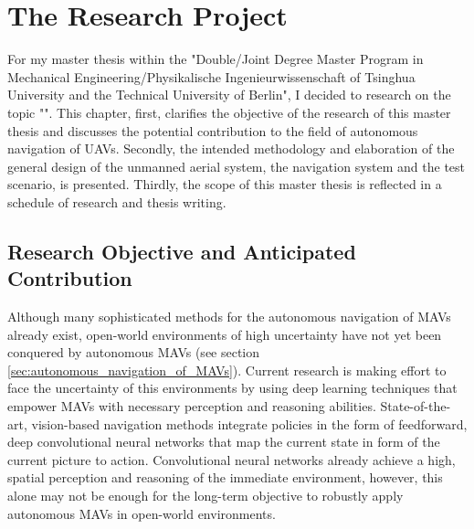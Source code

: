 
\chapter{The Research Project} \label{cha:research_project} %

For my master thesis within the  
"Double/Joint Degree Master Program in Mechanical Engineering/Physikalische Ingenieurwissenschaft 
of Tsinghua University and the Technical University of Berlin",
I decided to research on the topic "\ttitle".
This chapter, first, clarifies the objective of the research of this master thesis and
discusses the potential contribution to the field of autonomous navigation of UAVs.
Secondly, the intended methodology and elaboration of
the general design of the unmanned aerial system, the navigation system and the test scenario, is presented.
Thirdly, the scope of this master thesis is reflected in a schedule of research and thesis writing.











\section{Research Objective and Anticipated Contribution}

Although many sophisticated methods for the autonomous navigation of MAVs already exist,
open-world environments of high uncertainty have not yet been conquered by autonomous MAVs (see section \ref{sec:autonomous_navigation_of_MAVs}).
Current research is making effort to face the uncertainty of this environments by using deep learning techniques 
that empower MAVs with necessary perception and reasoning abilities.
State-of-the-art, vision-based navigation methods integrate policies in the form of feedforward, deep convolutional neural networks
that map the current state in form of the current picture to action.
Convolutional neural networks already achieve a high, spatial perception and reasoning of the immediate environment, however, 
this alone may not be enough for the long-term objective to robustly apply autonomous MAVs in open-world environments.

